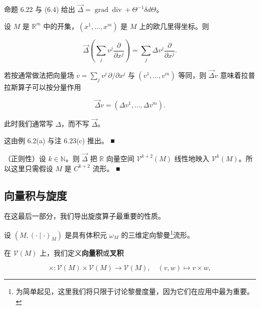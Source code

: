 \begin{remark}

\begin{items}
\item

命题 6.22 与 (6.4) 给出 $ \vec{\Delta} = \operatorname{grad}\operatorname{div} + \Theta^{-1}\delta d\Theta $。

\item

设 $ M $ 是 $ \mathbb{R}^{m} $ 中的开集，$ (x^{1},\ldots,x^{m}) $ 是 $ M $ 上的欧几里得坐标。则

\[
\vec{\Delta}\left(\sum_{j} v^{j}\frac{\partial}{\partial x^{j}}\right) = \sum_{j} \Delta v^{j}\frac{\partial}{\partial x^{j}} .
\]

若按通常做法把向量场 $ v = \sum_{j} v^{j}\, \partial/\partial x^{j} $ 与 $ (v^{1},\ldots,v^{m}) $ 等同，则 $ \vec{\Delta}v $ 意味着拉普拉斯算子可以按分量作用

\[
\vec{\Delta}v = (\Delta v^{1},\ldots,\Delta v^{m}) .
\]

此时我们通常写 $ \Delta $，而不写 $ \vec{\Delta} $。

\proofhead
这由例 6.2(a) 与注 6.23(c) 推出。 \nobreak\hspace{0.35em}■
\item

（正则性）设 $ k \in \mathbb{N} $。则 $ \vec{\Delta} $ 把 $ \mathbb{R} $ 向量空间 $ \mathcal{V}^{k+2}(M) $ 线性地映入 $ \mathcal{V}^{k}(M) $。所以这里只需假设 $ M $ 是 $ C^{k+2} $ 流形。 \nobreak\hspace{0.35em}■

\end{items}

\end{remark}

\subsection*{向量积与旋度}

在这最后一部分，我们导出旋度算子最重要的性质。

设 $ (M,(\cdot\mid\cdot)_{M}) $ 是具有体积元 $ \omega_{M} $ 的三维定向黎曼\footnote{为简单起见，这里我们将只限于讨论黎曼度量，因为它们在应用中最为重要。}流形。

在 $ \mathcal{V}(M) $ 上，我们定义\textbf{向量积}或\textbf{叉积}

\begin{equation}
\times : \mathcal{V}(M)\times\mathcal{V}(M) \to \mathcal{V}(M), \quad (v,w) \mapsto v\times w,\tag{6.36}
\end{equation}

